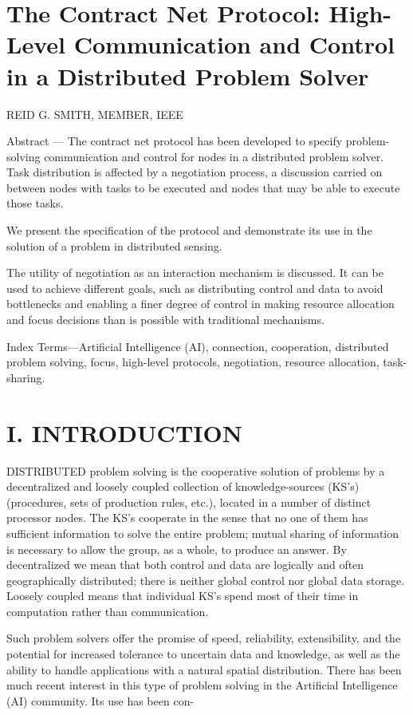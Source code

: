 \documentclass[
]{article}
\author{}
\date{}
\begin{document}
\section{The Contract Net Protocol: High-Level Communication and Control
in a Distributed Problem
Solver}\label{the-contract-net-protocol-high-level-communication-and-control-in-a-distributed-problem-solver}

REID G. SMITH, MEMBER, IEEE

Abstract --- The contract net protocol has been developed to specify
problem-solving communication and control for nodes in a distributed
problem solver. Task distribution is affected by a negotiation process,
a discussion carried on between nodes with tasks to be executed and
nodes that may be able to execute those tasks.

We present the specification of the protocol and demonstrate its use in
the solution of a problem in distributed sensing.

The utility of negotiation as an interaction mechanism is discussed. It
can be used to achieve different goals, such as distributing control and
data to avoid bottlenecks and enabling a finer degree of control in
making resource allocation and focus decisions than is possible with
traditional mechanisms.

Index Terms---Artificial Intelligence (AI), connection, cooperation,
distributed problem solving, focus, high-level protocols, negotiation,
resource allocation, task-sharing.

\section{I. INTRODUCTION}\label{i.-introduction}

DISTRIBUTED problem solving is the cooperative solution of problems by a
decentralized and loosely coupled collection of knowledge-sources (KS's)
(procedures, sets of production rules, etc.), located in a number of
distinct processor nodes. The KS's cooperate in the sense that no one of
them has sufficient information to solve the entire problem; mutual
sharing of information is necessary to allow the group, as a whole, to
produce an answer. By decentralized we mean that both control and data
are logically and often geographically distributed; there is neither
global control nor global data storage. Loosely coupled means that
individual KS's spend most of their time in computation rather than
communication.

Such problem solvers offer the promise of speed, reliability,
extensibility, and the potential for increased tolerance to uncertain
data and knowledge, as well as the ability to handle applications with a
natural spatial distribution. There has been much recent interest in
this type of problem solving in the Artificial Intelligence (AI)
community. Its use has been con-
\end{document}
